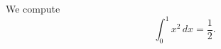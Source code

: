 \documentclass{article}
\begin{document}
We compute
\[
\int_0^1 x^2 \, dx = \frac{1}{2}.
\]
\end{document}
